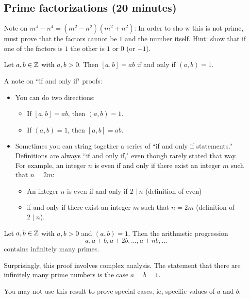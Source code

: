 \documentclass{../ximera}
\begin{document}

\subsection{Prime factorizations (20 minutes)}
Note on $m^4-n^4=(m^2-n^2)(m^2+n^2)$: In order to sho w this is not prime, must prove that the factors cannot be $1$ and the number itself. Hint: show that if one of the factors is $1$ the other is $1$ or $0$ (or $-1$).


\begin{cor*}[Corollary 1.20]\label{cor:lcm-gcd}
 Let $a,b\in\mathbb Z$ with $a,b>0$. Then $[a,b]=ab$ if and only if $(a,b)=1$.
\end{cor*}
A note on ``if and only if" proofs: 
\begin{itemize}
 \item You can do two directions: 
\begin{itemize}
 \item  If $[a,b]=ab$, then $(a,b)=1$.
 \item  If $(a,b)=1$, then $[a,b]=ab$.
\end{itemize}
\item Sometimes you can string together a series of ``if and only if statements." Definitions are always ``if and only if," even though rarely stated that way. For example, an integer $n$ is even if and only if there exist an integer $m$ such that $n=2m$:
\begin{itemize}
 \item An integer $n$ is even if and only if $2\mid n$ (definition of even) 
 \item if and only if there exist an integer $m$ such that $n=2m$ (definition of $2\mid n$).
\end{itemize}
\end{itemize}

\begin{thm*}\label{thm:dirichlet}
 Let $a,b\in\mathbb Z$ with $a,b>0$ and $(a,b)=1$. Then the arithmetic progression \[a,a+b, a+2b, \dots, a+nb,\dots\]
 contains infinitely many primes.
\end{thm*}
Surprisingly, this proof involves complex analysis. The statement that there are infinitely many prime numbers is the case $a=b=1$.


\begin{warning}
    You may not use this result to prove special cases, ie, specific values of $a$ and $b$.
\end{warning}
\end{document}
